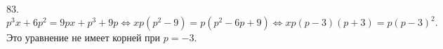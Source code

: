 83. $p^3x+6p^2=9px+p^3+9p\Leftrightarrow xp(p^2-9)=p(p^2-6p+9)\Leftrightarrow xp (p-3)(p+3)=p(p-3)^2.$ Это уравнение не имеет корней при $p=-3.$\\
